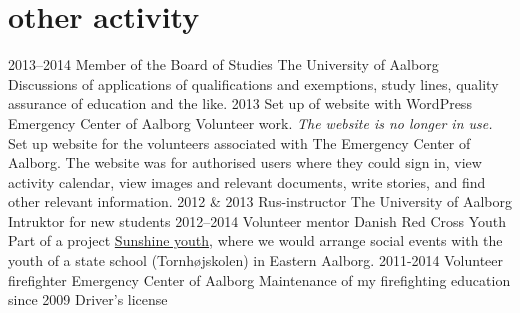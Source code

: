 \documentclass[print]{friggeri-cv}
\begin{document}
\section{other activity}

\begin{entrylist}
  \entry
  {2013–2014}
  {Member of the Board of Studies}
  {The University of Aalborg}
  {Discussions of applications of qualifications and exemptions, study lines, quality assurance of education and the like.}
  \entry
  {2013}
  {Set up of website with WordPress}
  {Emergency Center of Aalborg}
  {Volunteer work.
  \textit{The website is no longer in use.}
  Set up website for the volunteers associated with The Emergency Center of Aalborg.
  The website was for authorised users where they could sign in, view activity calendar, view images and relevant documents, write stories, and find other relevant information.
  }
  \entry
  {2012 \& 2013}
  {Rus-instructor}
  {The University of Aalborg}
  {Intruktor for new students}
  \entry
  {2012–2014}
  {Volunteer mentor}
  {Danish Red Cross Youth}
  {Part of a project \href{http://www.urk.dk/solskinsunge/}{Sunshine youth}, where we would arrange social events with the youth of a state school (Tornhøjskolen) in Eastern Aalborg.}
  \entry
  {2011-2014}
  {Volunteer firefighter}
  {Emergency Center of Aalborg}
  {Maintenance of my firefighting education}
  \entry
  {since 2009}
  {Driver's license}
  {}{}
\end{entrylist}
\end{document}
